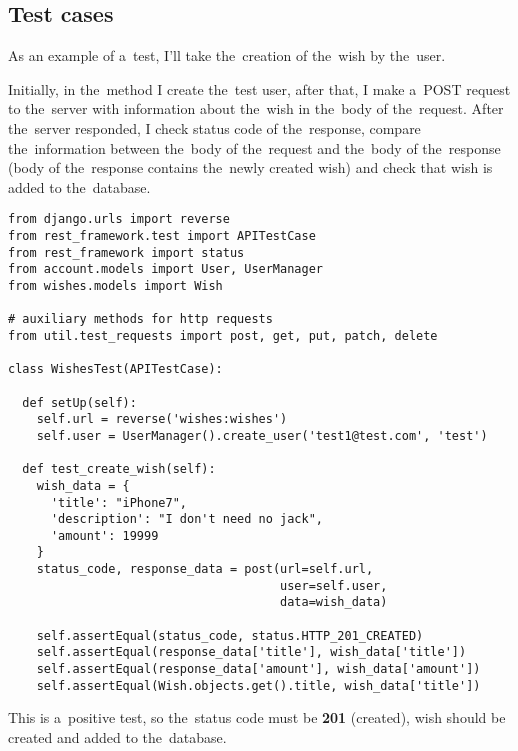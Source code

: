 \subsection{Test cases}
As an example of a~test, I'll take the~creation of the~wish by the~user.

Initially, in the~method  I create the~test user, after that, I make a~POST request to the~server with
information about the~wish in the~body of the~request. After the~server responded, I check status code of the~response,
compare the~information between the~body of the~request and the~body of the~response (body of the~response contains
the~newly created wish) and check that wish is added to the~database.

\begin{lstlisting}
from django.urls import reverse
from rest_framework.test import APITestCase
from rest_framework import status
from account.models import User, UserManager
from wishes.models import Wish

# auxiliary methods for http requests
from util.test_requests import post, get, put, patch, delete

class WishesTest(APITestCase):

  def setUp(self):
    self.url = reverse('wishes:wishes')
    self.user = UserManager().create_user('test1@test.com', 'test')

  def test_create_wish(self):
    wish_data = {
      'title': "iPhone7",
      'description': "I don't need no jack",
      'amount': 19999
    }
    status_code, response_data = post(url=self.url,
                                      user=self.user,
                                      data=wish_data)

    self.assertEqual(status_code, status.HTTP_201_CREATED)
    self.assertEqual(response_data['title'], wish_data['title'])
    self.assertEqual(response_data['amount'], wish_data['amount'])
    self.assertEqual(Wish.objects.get().title, wish_data['title'])

\end{lstlisting}

This is a~positive test, so the~status code must be \textbf{201} (created), wish should be created and added to
the~database.



\newcommand{\flag}[1]{
\item[]-\textbf{#1}
}

\newcommand{\bnitem}[1]{
\item\textbf{#1}.}
